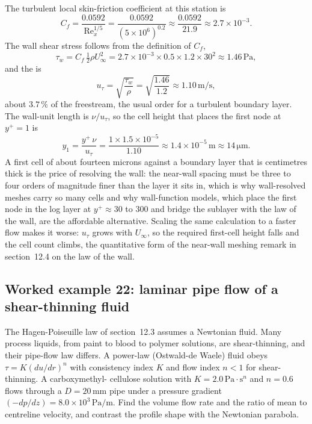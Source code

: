 The turbulent local skin-friction coefficient at this station is
\[
C_f = \frac{0.0592}{\text{Re}_x^{1/5}} = \frac{0.0592}{(5\times10^{6})
^{0.2}} \approx \frac{0.0592}{21.9} \approx 2.7\times10^{-3}.
\]
The wall shear stress follows from the definition of $C_f$,
\[
\tau_w = C_f\,\tfrac12\rho U_\infty^2 = 2.7\times10^{-3}\times0.5\times
1.2\times30^2 \approx 1.46\,\si{\pascal},
\]
and the  is
\[
u_\tau = \sqrt{\frac{\tau_w}{\rho}} = \sqrt{\frac{1.46}{1.2}} \approx
1.10\,\si{\meter\per\second},
\]
about $3.7\,\%$ of the freestream, the usual order for a turbulent
boundary layer. The wall-unit length is $\nu/u_\tau$, so the cell
height that places the first node at $y^+ = 1$ is
\[
y_1 = \frac{y^+\,\nu}{u_\tau} = \frac{1\times1.5\times10^{-5}}{1.10}
\approx 1.4\times10^{-5}\,\si{\meter} \approx 14\,\si{\micro\meter}.
\]
A first cell of about fourteen microns against a boundary layer that is
centimetres thick is the price of resolving the wall: the near-wall
spacing must be three to four orders of magnitude finer than the layer
it sits in, which is why wall-resolved meshes carry so many cells and
why wall-function models, which place the first node in the log layer
at $y^+\approx30$ to $300$ and bridge the sublayer with the law of the
wall, are the affordable alternative. Scaling the same calculation to a
faster flow makes it worse: $u_\tau$ grows with $U_\infty$, so the
required first-cell height falls and the cell count climbs, the
quantitative form of the near-wall meshing remark in section~12.4 on
the law of the wall.

\subsection*{Worked example 22: laminar pipe flow of a shear-thinning fluid}

The Hagen-Poiseuille law of section~12.3 assumes a Newtonian fluid. Many
process liquids, from paint to blood to polymer solutions, are
shear-thinning, and their pipe-flow law differs. A power-law
(Ostwald-de Waele) fluid obeys $\tau = K(du/dr)^n$ with consistency
index $K$ and flow index $n < 1$ for shear-thinning. A carboxymethyl-
cellulose solution with $K = 2.0\,\si{\pascal}\cdot\text{s}^n$ and
$n = 0.6$ flows through a $D = 20\,\si{\milli\meter}$ pipe under a
pressure gradient $(-dp/dz) = 8.0\times10^{3}\,\si{\pascal\per\meter}$.
Find the volume flow rate and the ratio of mean to centreline velocity,
and contrast the profile shape with the Newtonian parabola.

